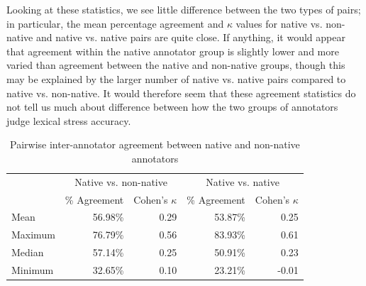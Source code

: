 		Looking at these statistics, we see little difference between the two types of pairs; in particular, the mean percentage agreement and $\kappa$ values for native vs. non-native and native vs. native pairs are quite close. 
		If anything, it would appear that agreement within the native annotator group is slightly lower and more varied than agreement between the native and non-native groups, though this may be explained by the larger number of native vs. native pairs compared to native vs. non-native. It would therefore seem that these agreement statistics do not tell us much about difference between how the two groups of annotators judge lexical stress accuracy.
		
		
		\begin{table}[p]%
			\centering
			\caption[Pairwise agreement between native and non-native annotators]{Pairwise inter-annotator agreement between native and non-native annotators}
			\begin{tabular}{lrrrr}
			\toprule
			& \multicolumn{2}{c}{Native vs. non-native} & \multicolumn{2}{c}{Native vs. native} \\
			\cmidrule(lr){2-3} \cmidrule(lr){4-5}
			& \% Agreement & Cohen's $\kappa$ & \% Agreement & Cohen's $\kappa$  \\
			\midrule
Mean	&56.98\%	 & 0.29  & 53.87\%	& 0.25\\
Maximum&	76.79\%	& 0.56 & 83.93\%	 & 0.61\\
Median	& 57.14\%	 &0.25 &  50.91\%	& 0.23 \\
Minimum	&32.65\%	 & 0.10 &  23.21\% &	-0.01\\
			\bottomrule
			\end{tabular}
			\label{tab:agreement:L1}
		\end{table} 
		

